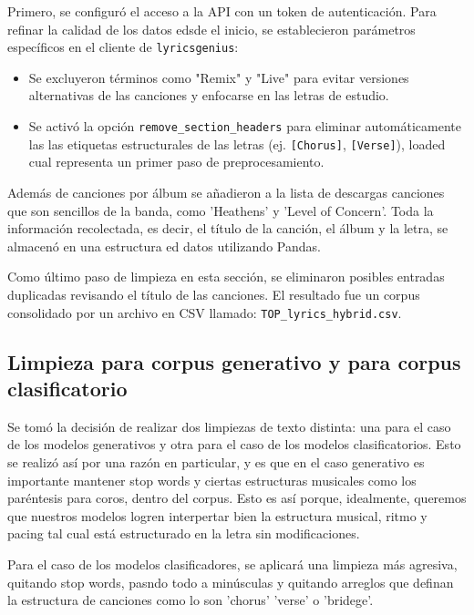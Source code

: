 Primero, se configuró el acceso a la API con un token de autenticación. Para refinar la calidad
de los datos edsde el inicio, se establecieron parámetros específicos en el cliente de \texttt{lyricsgenius}:

\begin{itemize}
    \item Se excluyeron términos como "Remix" y "Live" para evitar versiones alternativas de 
    las canciones y enfocarse en las letras de estudio.
    \item Se activó la opción \texttt{remove\_section\_headers} para eliminar automáticamente las
    las etiquetas estructurales de las letras (ej. \texttt{[Chorus]}, \texttt{[Verse]}), loaded
    cual representa un primer paso de preprocesamiento. 
\end{itemize}

Además de canciones por álbum se añadieron a la lista de descargas canciones que son sencillos 
de la banda, como 'Heathens' y 'Level of Concern'. Toda la información recolectada, es decir, el título
de la canción, el álbum y la letra, se almacenó en una estructura ed datos utilizando Pandas. 

Como último paso de limpieza en esta sección, se eliminaron posibles entradas duplicadas revisando el título
de las canciones. El resultado fue un corpus consolidado por un archivo en CSV llamado: \texttt{TOP\_lyrics\_hybrid.csv}.

\subsection{Limpieza para corpus generativo y para corpus clasificatorio}

Se tomó la decisión de realizar dos limpiezas de texto distinta: una para el caso de los modelos
generativos y otra para el caso de los modelos clasificatorios. Esto se realizó así por una
razón en particular, y es que en el caso generativo es importante mantener stop words y ciertas estructuras
musicales como los paréntesis para coros, dentro del corpus. Esto es así porque, idealmente, queremos
que nuestros modelos logren interpertar bien la estructura musical, ritmo y pacing tal cual
está estructurado en la letra sin modificaciones. 

Para el caso de los modelos clasificadores, se aplicará una limpieza más agresiva, quitando
stop words, pasndo todo a minúsculas y quitando arreglos que definan la estructura de canciones
como lo son 'chorus' 'verse' o 'bridege'. 

